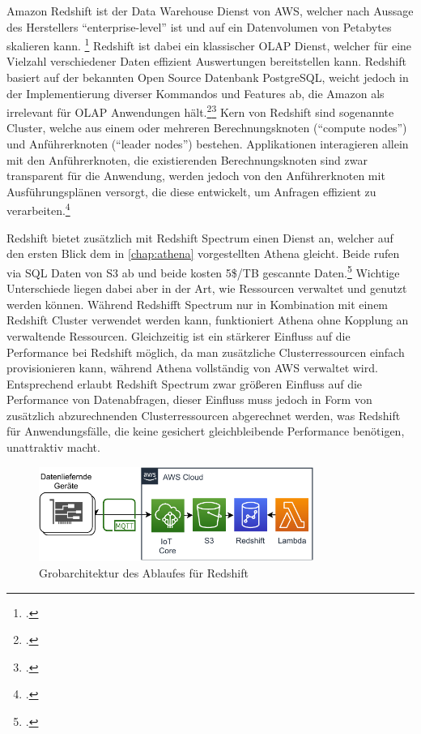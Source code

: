 Amazon Redshift ist der Data Warehouse Dienst von \ac{AWS}, welcher nach Aussage des Herstellers \enquote{enterprise-level} ist und auf ein Datenvolumen von Petabytes skalieren kann. \footcite[Vgl.][1]{AmazonWebServicesInc..o.J.g} Redshift ist dabei ein klassischer \ac{OLAP} Dienst, welcher für eine Vielzahl verschiedener Daten effizient Auswertungen bereitstellen kann. Redshift basiert auf der bekannten Open Source Datenbank PostgreSQL, weicht jedoch in der Implementierung diverser Kommandos und Features ab, die Amazon als irrelevant für \ac{OLAP} Anwendungen hält.\footcite[Vgl.][4]{AmazonWebServicesInc..o.J.g}\nzitat\footcite[Vgl.][428\psqq]{AmazonWebServicesInc..o.J.g} Kern von Redshift sind sogenannte Cluster, welche aus einem oder mehreren Berechnungsknoten (\enquote{compute nodes}) und Anführerknoten (\enquote{leader nodes}) bestehen. Applikationen interagieren allein mit den Anführerknoten, die existierenden Berechnungsknoten sind zwar transparent für die Anwendung, werden jedoch von den Anführerknoten mit Ausführungsplänen versorgt, die diese entwickelt, um Anfragen effizient zu verarbeiten.\footcite[Vgl.][4]{AmazonWebServicesInc..o.J.g}

Redshift bietet zusätzlich mit Redshift Spectrum einen Dienst an, welcher auf den ersten Blick dem in \autoref{chap:athena} vorgestellten Athena gleicht. Beide rufen via \ac{SQL} Daten von \ac{S3} ab und beide kosten 5\$/TB gescannte Daten.\footcite[Vgl. auch im Folgenden][]{Smallcombe.2020} Wichtige Unterschiede liegen dabei aber in der Art, wie Ressourcen verwaltet und genutzt werden können. Während Redshifft Spectrum nur in Kombination mit einem Redshift Cluster verwendet werden kann, funktioniert Athena ohne Kopplung an verwaltende Ressourcen. Gleichzeitig ist ein stärkerer Einfluss auf die Performance bei Redshift möglich, da man zusätzliche Clusterressourcen einfach provisionieren kann, während Athena vollständig von \ac{AWS} verwaltet wird. Entsprechend erlaubt Redshift Spectrum zwar größeren Einfluss auf die Performance von Datenabfragen, dieser Einfluss muss jedoch in Form von zusätzlich abzurechnenden Clusterressourcen abgerechnet werden, was Redshift für Anwendungsfälle, die keine gesichert gleichbleibende Performance benötigen, unattraktiv macht.

\begin{figure}[H]
\centering
\includegraphics[width=0.8\textwidth]{graphics/Redshift-general.pdf}
\caption{Grobarchitektur des Ablaufes für Redshift}
\label{abb:GrobArchitekturRedshift}
\end{figure}

